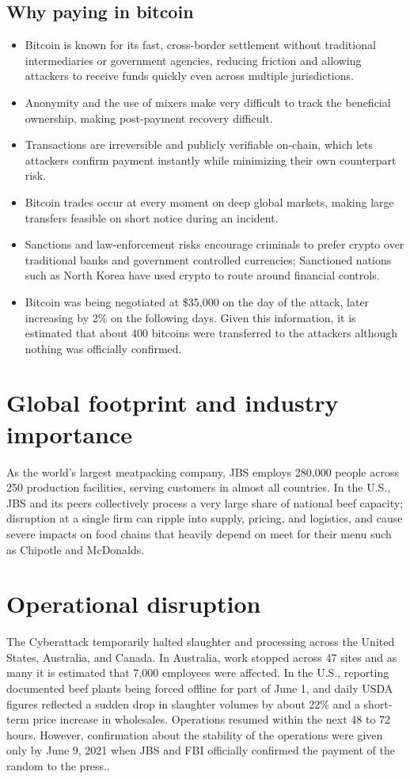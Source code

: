 \documentclass[conference]{IEEEtran}
\begin{document}
\subsection{Why paying in bitcoin}\label{SCM}
\begin{itemize}
\item Bitcoin is known for its fast, cross-border settlement without traditional intermediaries or government agencies, reducing friction and allowing attackers to receive funds quickly even across multiple jurisdictions.
\item Anonymity and the use of mixers make very difficult to track the beneficial ownership, making post-payment recovery difficult.
\item Transactions are irreversible and publicly verifiable on-chain, which lets attackers confirm payment instantly while minimizing their own counterpart risk.
\item Bitcoin trades occur at every moment on deep global markets, making large transfers feasible on short notice during an incident.
\item Sanctions and law-enforcement risks encourage criminals to prefer crypto over traditional banks and government controlled currencies; Sanctioned nations such as North Korea have used crypto to route around financial controls.
\item Bitcoin was being negotiated at \$35{,}000 on the day of the attack, later increasing by 2\% on the following days. Given this information, it is estimated that about 400 bitcoins were transferred to the attackers although nothing was officially confirmed.
\end{itemize}

\section{Global footprint and industry importance}
As the world's largest meatpacking company, JBS employs 280,000 people across 250 production facilities, serving customers in almost all countries. In the U.S., JBS and its peers collectively process a very large share of national beef capacity; disruption at a single firm can ripple into supply, pricing, and logistics, and cause severe impacts on food chains that heavily depend on meet for their menu such as Chipotle and McDonalds.

\section{Operational disruption}
The Cyberattack temporarily halted slaughter and processing across the United States, Australia, and Canada. In Australia, work stopped across 47 sites and as many it is estimated that 7,000 employees were affected. In the U.S., reporting documented beef plants being forced offline for part of June 1, and daily USDA figures reflected a sudden drop in slaughter volumes by about 22\% and a short-term price increase in wholesales. Operations resumed within the next 48 to 72 hours. However, confirmation about the stability of the operations were given only by June 9, 2021 when JBS and FBI officially confirmed the payment of the random to the press..
\end{document}
